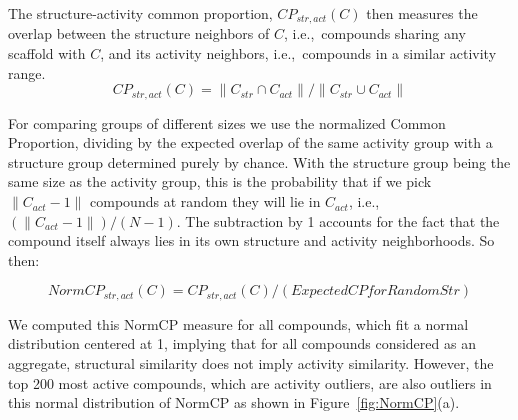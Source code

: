\documentclass[journal=jacsat,manuscript=article]{achemso}
\newcommand*\fref[1]{Figure~\ref{fig:#1}}
\newcommand*\ie{i.e.,~}
\begin{document}
The structure-activity common proportion, $CP_{str,act}(C)$ then measures the overlap between the structure neighbors of $C$, \ie compounds sharing any scaffold with $C$, and its activity neighbors, \ie compounds in a similar activity range.
\begin{equation}
CP_{str,act}(C) = \| C_{str} \cap C_{act} \| / \| C_{str} \cup C_{act} \|
\end{equation}

For comparing groups of different sizes we use the normalized Common Proportion, dividing by the expected overlap of the same activity group with a structure group determined purely by chance.  With the structure group being the same size as the activity group, this is the probability that if we pick $ \| C_{act} - 1\|$ compounds at random they will lie in $C_{act}$, \ie $(\| C_{act} - 1\|)/(N - 1)$. The subtraction by 1 accounts for the fact that the compound itself always lies in its own structure and activity neighborhoods. So then:

\begin{equation}
NormCP_{str,act}(C) = CP_{str,act}(C) / (Expected CP for Random Str) 
\end{equation}

We computed this NormCP measure for all compounds, which fit a normal distribution centered at 1, implying that for all compounds considered as an aggregate, structural similarity does not imply activity similarity.  However, the top 200 most active compounds, which are activity outliers, are also outliers in this normal distribution of NormCP as shown in \fref{NormCP}(a).
\end{document}
